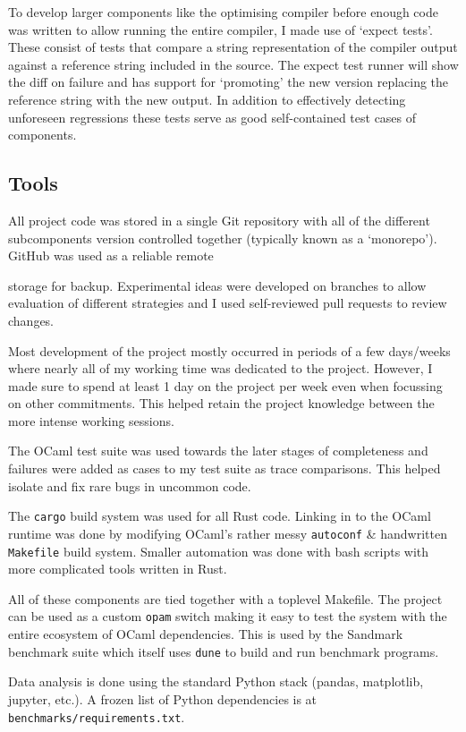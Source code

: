 To develop larger components like the optimising compiler before enough code was written to allow
running the entire compiler, I made use of `expect tests'. These consist of tests that compare a
string representation of the compiler output against a reference string included in the source. The
expect test runner will show the diff on failure and has support for `promoting' the new version
replacing the reference string with the new output. In addition to effectively detecting unforeseen
regressions these tests serve as good self-contained test cases of components.

\subsection{Tools}

All project code was stored in a single Git repository with all of the different subcomponents
version controlled together (typically known as a `monorepo'). GitHub was used as a reliable remote

storage for backup. Experimental ideas were developed on branches to allow evaluation of different
strategies and I used self-reviewed pull requests to review changes.

Most development of the project mostly occurred in periods of a few days/weeks where nearly
all of my working time was dedicated to the project. However, I made sure to spend at least 1 day
on the project per week even when focussing on other commitments. This helped retain the project
knowledge between the more intense working sessions.

The OCaml test suite was used towards the later stages of completeness and failures were added as
cases to my test suite as trace comparisons. This helped isolate and fix rare bugs in uncommon
code.

The \texttt{cargo} build system was used for all Rust code. Linking in to the OCaml runtime
was done by modifying OCaml's rather messy \texttt{autoconf} \& handwritten \texttt{Makefile} build
system. Smaller automation was done with bash scripts with more complicated tools written in Rust.

All of these components are tied together with a toplevel Makefile. The project can be used as a
custom
\texttt{opam} switch making it easy to test the system with the entire ecosystem of OCaml
dependencies.
This is used by the Sandmark benchmark suite which itself uses \texttt{dune} to build and run
benchmark programs.

Data analysis is done using the standard Python stack (pandas, matplotlib, jupyter, etc.). A frozen
list of Python dependencies is at \texttt{benchmarks/requirements.txt}.

